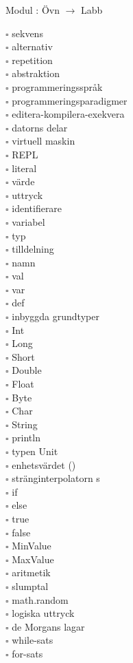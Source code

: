 
Modul : Övn  $\rightarrow$ Labb 
\begin{multicols}{3}\SlideFontTiny
$\square$ sekvens \\
$\square$ alternativ \\
$\square$ repetition \\
$\square$ abstraktion \\
$\square$ programmeringsspråk \\
$\square$ programmeringsparadigmer \\
$\square$ editera-kompilera-exekvera \\
$\square$ datorns delar \\
$\square$ virtuell maskin \\
$\square$ REPL \\
$\square$ literal \\
$\square$ värde \\
$\square$ uttryck \\
$\square$ identifierare \\
$\square$ variabel \\
$\square$ typ \\
$\square$ tilldelning \\
$\square$ namn \\
$\square$ val \\
$\square$ var \\
$\square$ def \\
$\square$ inbyggda grundtyper \\
$\square$ Int \\
$\square$ Long \\
$\square$ Short \\
$\square$ Double \\
$\square$ Float \\
$\square$ Byte \\
$\square$ Char \\
$\square$ String \\
$\square$ println \\
$\square$ typen Unit \\
$\square$ enhetsvärdet () \\
$\square$ stränginterpolatorn s \\
$\square$ if \\
$\square$ else \\
$\square$ true \\
$\square$ false \\
$\square$ MinValue \\
$\square$ MaxValue \\
$\square$ aritmetik \\
$\square$ slumptal \\
$\square$ math.random \\
$\square$ logiska uttryck \\
$\square$ de Morgans lagar \\
$\square$ while-sats \\
$\square$ for-sats \\     
\end{multicols}
